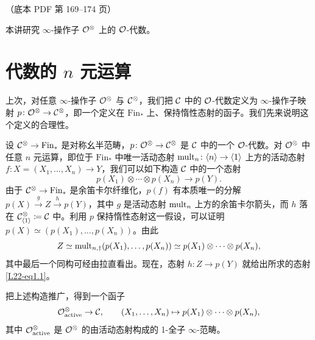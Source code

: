 \begin{center}\small\color{black!55}（底本 PDF 第 169–174 页）\end{center}

本讲研究 $\infty$-操作子 $\mathcal{O}^{\otimes}$ 上的 $\mathcal{O}$-代数。

\section{代数的 $n$ 元运算}

\nitem\label{L22-1.1} 上次，对任意 $\infty$-操作子 $\mathcal{O}^{\otimes}$ 与 $\mathcal{C}^{\otimes}$，我们把 $\mathcal{C}$ 中的 $\mathcal{O}$-代数定义为 $\infty$-操作子映射 $p\colon\mathcal{O}^{\otimes}\to\mathcal{C}^{\otimes}$，即一个定义在 $\mathrm{Fin}_{*}$ 上、保持惰性态射的函子。我们先来说明这个定义的合理性。


\nitem\label{L22-1.2} 设 $\mathcal{C}^{\otimes}\to\mathrm{Fin}_{*}$ 是对称幺半范畴，$p\colon\mathcal{O}^{\otimes}\to\mathcal{C}^{\otimes}$ 是 $\mathcal{C}$ 中的一个 $\mathcal{O}$-代数。对 $\mathcal{O}^{\otimes}$ 中任意 $n$ 元运算，即位于 $\mathrm{Fin}_{*}$ 中唯一活动态射 $\operatorname{mult}_{n}\colon\langle n\rangle\to\langle1\rangle$ 上方的活动态射 $f\colon X=(X_{1},\dots,X_{n})\to Y$，我们可以如下构造 $\mathcal{C}$ 中的一个态射
\begin{equation}\label{L22-eq1.1}
p(X_{1})\otimes\cdots\otimes p(X_{n})\to p(Y).
\end{equation}
由于 $\mathcal{C}^{\otimes}\to\mathrm{Fin}_{*}$ 是余笛卡尔纤维化，$p(f)$ 有本质唯一的分解 $p(X)\xrightarrow{g}Z\xrightarrow{h}p(Y)$，其中 $g$ 是活动态射 $\operatorname{mult}_{n}$ 上方的余笛卡尔箭头，而 $h$ 落在 $\mathcal{C}^{\otimes}_{\langle1\rangle}\coloneqq\mathcal{C}$ 中。利用 $p$ 保持惰性态射这一假设，可以证明 $p(X)\simeq(p(X_{1}),\dots,p(X_{n}))$。由此
\[
Z\simeq\operatorname{mult}_{n,\dagger}(p(X_{1}),\dots,p(X_{n}))\simeq p(X_{1})\otimes\cdots\otimes p(X_{n}),
\]
其中最后一个同构可经由拉直看出。现在，态射 $h\colon Z\to p(Y)$ 就给出所求的态射 \eqref{L22-eq1.1}。

\begin{exercise}\label{L22-1.3}
把上述构造推广，得到一个函子
\[
\mathcal{O}^{\otimes}_{\mathrm{active}}\to\mathcal{C},\qquad (X_{1},\dots,X_{n})\mapsto p(X_{1})\otimes\cdots\otimes p(X_{n}),
\]
其中 $\mathcal{O}^{\otimes}_{\mathrm{active}}$ 是 $\mathcal{O}^{\otimes}$ 的由活动态射构成的 1-全子 $\infty$-范畴。
\end{exercise}

